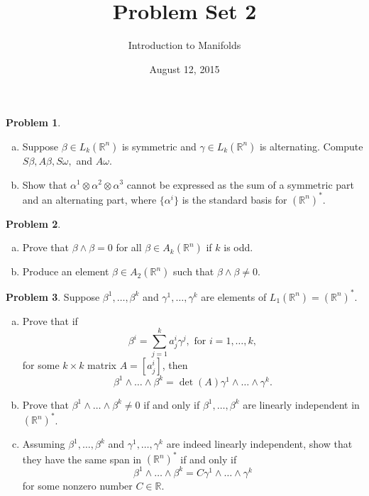 \documentclass{amsart}
\newcommand{\+}[1]{\ensuremath{\mathbf{#1}}}
\newcommand{\R}{{\mathbb R}}
\theoremstyle{definition}
\newtheorem{prob}{Problem}
\begin{document}
\title{Problem Set 2}
\date{August 12, 2015}
\author{Introduction to Manifolds}

\maketitle



\begin{prob}
 \begin{enumerate}[(a)]
  \item Suppose $\beta \in L_k(\R^n)$ is symmetric and $\gamma \in L_k(\R^n)$ is alternating.
  Compute $S\beta, A\beta, S\omega,$ and $A\omega$.
  \item Show that $\alpha^1 \otimes \alpha^2 \otimes \alpha^3$ cannot be expressed 
  as the sum of a symmetric part and an alternating part, where $\{\alpha^i\}$ is the standard basis for $(\R^n)^*$.
 \end{enumerate}
\end{prob}

\begin{prob}
\begin{enumerate}[(a)]
 \item Prove that $\beta \wedge \beta = 0$ for all $\beta \in A_k(\R^n)$ if $k$ is odd.
 \item Produce an element $\beta \in A_2(\R^n)$ such that $\beta \wedge \beta \neq 0$.
\end{enumerate}
\end{prob} 




\begin{prob}
Suppose $\beta^1, \ldots, \beta^k$ and $\gamma^1, \ldots, \gamma^k$
are elements  of $L_1(\R^n) = (\R^n)^*$.
\begin{enumerate}[(a)]
 \item Prove that if
\begin{equation*}
 \beta^i = \sum^k_{j=1} a^i_j \gamma^j, \text{ for } i = 1,\ldots,k,
\end{equation*}
for some $k \times k$ matrix $A = [a^i_j]$, then
\begin{equation*}
 \beta^1 \wedge \ldots \wedge \beta^k = \det(A) \gamma^1 \wedge
 \ldots \wedge \gamma^k.
\end{equation*}
\item Prove that $\beta^1 \wedge \ldots \wedge \beta^k \neq 0$
if and only if $\beta^1, \ldots, \beta^k$ are linearly independent
in $(\R^n)^*$.
\item Assuming $\beta^1, \ldots, \beta^k$
and $\gamma^1, \ldots, \gamma^k$ are indeed linearly independent,
show that they have the same span in $(\R^n)^*$ if and only if 
\begin{equation*}
  \beta^1 \wedge \ldots \wedge \beta^k = C \gamma^1 \wedge
 \ldots \wedge \gamma^k
\end{equation*}
for some nonzero number $C \in \R$.
\end{enumerate}
\end{prob}
\end{document}
